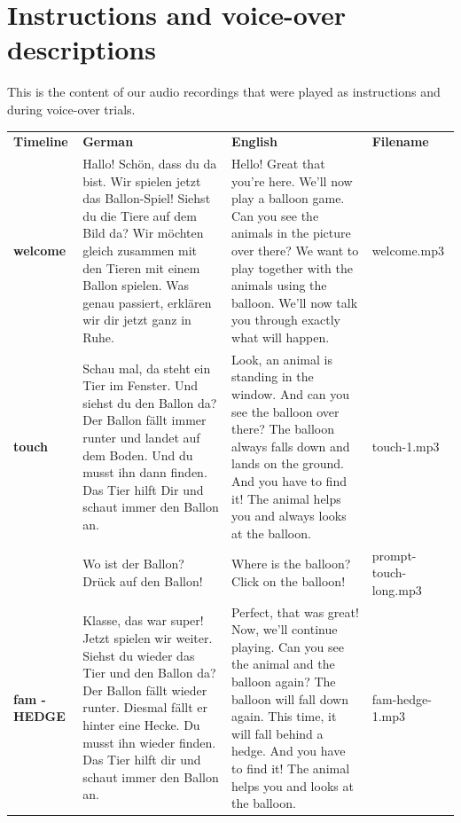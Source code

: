 \documentclass[
  man,floatsintext]{apa6}
\begin{document}
\newpage

\hypertarget{instructions-and-voice-over-descriptions}{%
\section{Instructions and voice-over descriptions}\label{instructions-and-voice-over-descriptions}}

This is the content of our audio recordings that were played as instructions and during voice-over trials.

\begin{longtable}[]{@{}
  >{\raggedright\arraybackslash}p{}
  >{\raggedright\arraybackslash}p{}
  >{\raggedright\arraybackslash}p{}
  >{\raggedright\arraybackslash}p{}@{}}
\toprule()
\endhead
\textbf{Timeline} & \textbf{German} & \textbf{English} & \textbf{Filename} \\
\textbf{welcome} & Hallo! Schön, dass du da bist. Wir spielen jetzt das Ballon-Spiel! Siehst du die Tiere auf dem Bild da? Wir möchten gleich zusammen mit den Tieren mit einem Ballon spielen. Was genau passiert, erklären wir dir jetzt ganz in Ruhe. & Hello! Great that you're here. We'll now play a balloon game. Can you see the animals in the picture over there? We want to play together with the animals using the balloon. We'll now talk you through exactly what will happen. & welcome.mp3 \\
\textbf{touch} & Schau mal, da steht ein Tier im Fenster. Und siehst du den Ballon da? Der Ballon fällt immer runter und landet auf dem Boden. Und du musst ihn dann finden. Das Tier hilft Dir und schaut immer den Ballon an. & Look, an animal is standing in the window. And can you see the balloon over there? The balloon always falls down and lands on the ground. And you have to find it! The animal helps you and always looks at the balloon. & touch-1.mp3 \\
& Wo ist der Ballon? Drück auf den Ballon! & Where is the balloon? Click on the balloon! & prompt-touch-long.mp3 \\
\textbf{fam - HEDGE} & Klasse, das war super! Jetzt spielen wir weiter. Siehst du wieder das Tier und den Ballon da? Der Ballon fällt wieder runter. Diesmal fällt er hinter eine Hecke. Du musst ihn wieder finden. Das Tier hilft dir und schaut immer den Ballon an. & Perfect, that was great! Now, we'll continue playing. Can you see the animal and the balloon again? The balloon will fall down again. This time, it will fall behind a hedge. And you have to find it! The animal helps you and looks at the balloon. & fam-hedge-1.mp3 \\

\end{longtable}
\end{document}
